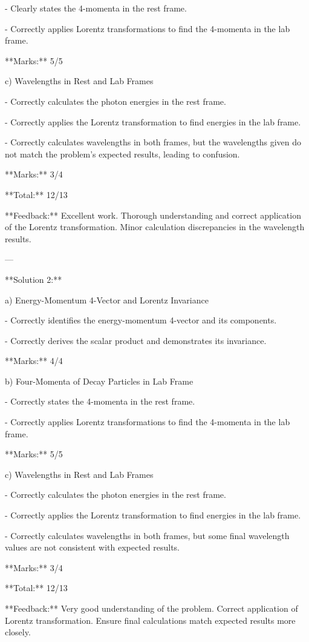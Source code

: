 \documentclass[a4paper,11pt]{article}
\begin{document}
- Clearly states the 4-momenta in the rest frame.

- Correctly applies Lorentz transformations to find the 4-momenta in the lab frame.

**Marks:** 5/5

c) Wavelengths in Rest and Lab Frames

- Correctly calculates the photon energies in the rest frame.

- Correctly applies the Lorentz transformation to find energies in the lab frame.

- Correctly calculates wavelengths in both frames, but the wavelengths given do not match the problem's expected results, leading to confusion.

**Marks:** 3/4

**Total:** 12/13

**Feedback:** Excellent work. Thorough understanding and correct application of the Lorentz transformation. Minor calculation discrepancies in the wavelength results.

---

**Solution 2:**

a) Energy-Momentum 4-Vector and Lorentz Invariance

- Correctly identifies the energy-momentum 4-vector and its components.

- Correctly derives the scalar product and demonstrates its invariance.

**Marks:** 4/4

b) Four-Momenta of Decay Particles in Lab Frame

- Correctly states the 4-momenta in the rest frame.

- Correctly applies Lorentz transformations to find the 4-momenta in the lab frame.

**Marks:** 5/5

c) Wavelengths in Rest and Lab Frames

- Correctly calculates the photon energies in the rest frame.

- Correctly applies the Lorentz transformation to find energies in the lab frame.

- Correctly calculates wavelengths in both frames, but some final wavelength values are not consistent with expected results.

**Marks:** 3/4

**Total:** 12/13

**Feedback:** Very good understanding of the problem. Correct application of Lorentz transformation. Ensure final calculations match expected results more closely.
\end{document}
